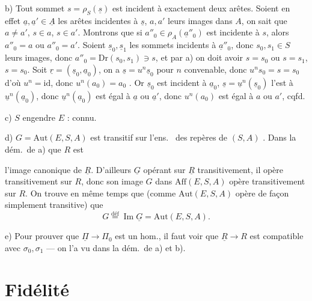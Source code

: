 \documentclass[11pt,a4paper]{article}
\begin{document}
b) Tout sommet $s = \rho_S(\underline{s})$ est incident à exactement deux arêtes. Soient en effet $\underline{a}, \underline{a}' \in \underline{A}$ les arêtes incidentes à $\underline{s}$, $a, a'$ leurs images dans $A$, on sait que $a \neq a'$, $s \in a$, $s \in a'$. Montrons que si $a''_0 \in \rho_A(\underline{a}''_0)$ est incidente à $s$, alors $a''_0 = a$ ou $a''_0 = a'$. \struck{\ill{}} Soient $\underline{s}_0, \underline{s}_1$ les sommets incidents à $\underline{a}''_0$, donc $s_0, s_1 \in S$ leurs images, donc  $a''_0 = \mathrm{Dr}(s_0, s_1) \ni s$, et par a) on doit avoir \struck{\ill{}} $s = s_0$ ou $s = s_1$,   $s = s_0$. Soit $\underline{r} = (\underline{s}_0, \underline{a}_0)$, on a $\underline{s} = u^n \underline{s}_0$ pour $n$ convenable, donc $u^n s_0 = s = s_0$ d'où $u^n = \mathrm{id}$, donc \struck{\ill{}} $u^n(a_0) = a_0$ \struck{\ill{}}. Or $\underline{s}_0$ est incident à $\underline{a}_0$, $\underline{s} = \underline{u}^n(\underline{s}_0)$ l'est à $\underline{u}^n(\underline{a}_0)$, donc $\underline{u}^n(\underline{a}_0)$ \struck{\ill{}} est égal à $\underline{a}$ ou $\underline{a}'$, donc $u^n(a_0)$  est égal à $a$ ou $a'$, cqfd.


c) $S$ engendre $E$ : connu.

d) $G = \mathrm{Aut}(E, S, A)$ est transitif sur l'ens.\  des repères de $(S, A)$ . Dans la dém.\ de a) \ill{}  que $R$ est

l'image canonique de $\underline{R}$. D'ailleurs $\underline{G}$ opérant sur $\underline{R}$ transitivement, il opère transitivement sur $R$, donc son image $G$ dans $\mathrm{Aff}(E, S, A)$ opère transitivement sur $R$. On trouve en même temps que (comme $\mathrm{Aut}(E, S, A)$ opère de façon simplement transitive) que
\[
  G \overset{\text{déf}}{=} \operatorname{Im} \underline{G} = \mathrm{Aut}(E, S, A).
\]

e) Pour prouver que $\underline{\Pi} \to \Pi_0$ est un hom., il faut voir que $\underline{R} \to R$ est compatible avec $\sigma_0, \sigma_1$ — on l'a vu dans la dém.\ de a) et b).

\section{Fidélité}
\end{document}

